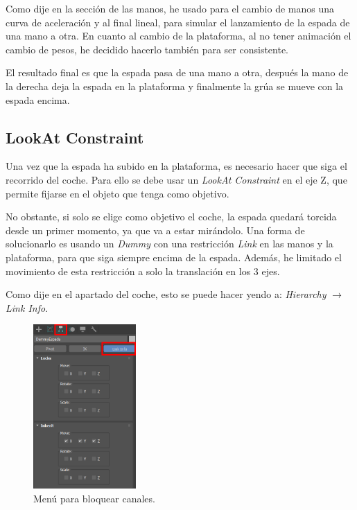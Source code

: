 Como dije en la sección de las manos, he usado para el cambio de manos una curva de aceleración y al final lineal, para simular el lanzamiento de la espada de una mano a otra. En cuanto al cambio de la plataforma, al no tener animación el cambio de pesos, he decidido hacerlo también para ser consistente.


\bigskip

El resultado final es que la espada pasa de una mano a otra, después la mano de la derecha deja la espada en la plataforma y finalmente la grúa se mueve con la espada encima.


\subsection{LookAt Constraint}

Una vez que la espada ha subido en la plataforma, es necesario hacer que siga el recorrido del coche. Para ello se debe usar un \textit{LookAt Constraint} en el eje Z, que permite fijarse en el objeto que tenga como objetivo. 

\bigskip

No obstante, si solo se elige como objetivo el coche, la espada quedará torcida desde un primer momento, ya que va a estar mirándolo. Una forma de solucionarlo es usando un \textit{Dummy} con una restricción \textit{Link} en las manos y la plataforma, para que siga siempre encima de la espada. Además, he limitado el movimiento de esta restricción a solo la translación en los 3 ejes.

\bigskip

Como dije en el apartado del coche, esto se puede hacer yendo a: \textit{Hierarchy} $\rightarrow$ \textit{Link Info}.

\begin{figure}[H]
    \centering
   \includegraphics[width=0.35\textwidth]{imagenes/espada/dummyTopHierarchy.png}
   \caption{Menú para bloquear canales.}
\end{figure}

